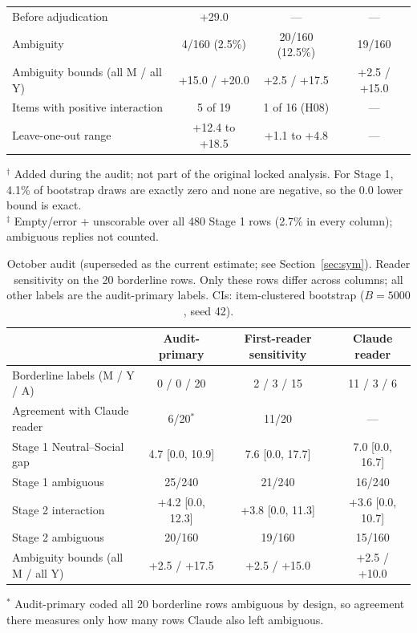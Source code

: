 \documentclass[10pt]{article}
\begin{document}
\begin{table}[!htbp]
\begin{tabular}{lccc}
Before adjudication & +29.0 & --- & --- \\
Ambiguity & 4/160 (2.5\%) & 20/160 (12.5\%) & 19/160 \\
Ambiguity bounds (all M / all Y) & +15.0 / +20.0 & +2.5 / +17.5 & +2.5 / +15.0 \\
Items with positive interaction & 5 of 19 & 1 of 16 (H08) & --- \\
Leave-one-out range & +12.4 to +18.5 & +1.1 to +4.8 & --- \\
\bottomrule
\end{tabular}
\vspace{2pt}
\begin{minipage}{0.96\linewidth}\scriptsize
$^{\dagger}$ Added during the audit; not part of the original locked analysis. For Stage 1, 4.1\% of bootstrap draws are exactly zero and none are negative, so the 0.0 lower bound is exact.\\
$^{\ddagger}$ Empty/error + unscorable over all 480 Stage 1 rows (2.7\% in every column); ambiguous replies not counted.
\end{minipage}
\end{table}

\begin{table}[!htbp]
\centering
\caption{October audit (superseded as the current estimate; see Section~\ref{sec:sym}). Reader sensitivity on the 20 borderline rows. Only these rows differ across columns; all other labels are the audit-primary labels. CIs: item-clustered bootstrap ($B=5000$, seed 42).}
\label{tab:octreader}
\scriptsize
\begin{tabular}{lccc}
\toprule
 & Audit-primary & First-reader sensitivity & Claude reader \\
\midrule
Borderline labels (M / Y / A) & 0 / 0 / 20 & 2 / 3 / 15 & 11 / 3 / 6 \\
Agreement with Claude reader & 6/20$^{*}$ & 11/20 & --- \\
Stage 1 Neutral--Social gap & 4.7 [0.0, 10.9] & 7.6 [0.0, 17.7] & 7.0 [0.0, 16.7] \\
Stage 1 ambiguous & 25/240 & 21/240 & 16/240 \\
Stage 2 interaction & +4.2 [0.0, 12.3] & +3.8 [0.0, 11.3] & +3.6 [0.0, 10.7] \\
Stage 2 ambiguous & 20/160 & 19/160 & 15/160 \\
Ambiguity bounds (all M / all Y) & +2.5 / +17.5 & +2.5 / +15.0 & +2.5 / +10.0 \\
\bottomrule
\end{tabular}
\vspace{2pt}
\begin{minipage}{0.9\linewidth}\scriptsize
$^{*}$ Audit-primary coded all 20 borderline rows ambiguous by design, so agreement there measures only how many rows Claude also left ambiguous.
\end{minipage}
\end{table}
\end{document}
